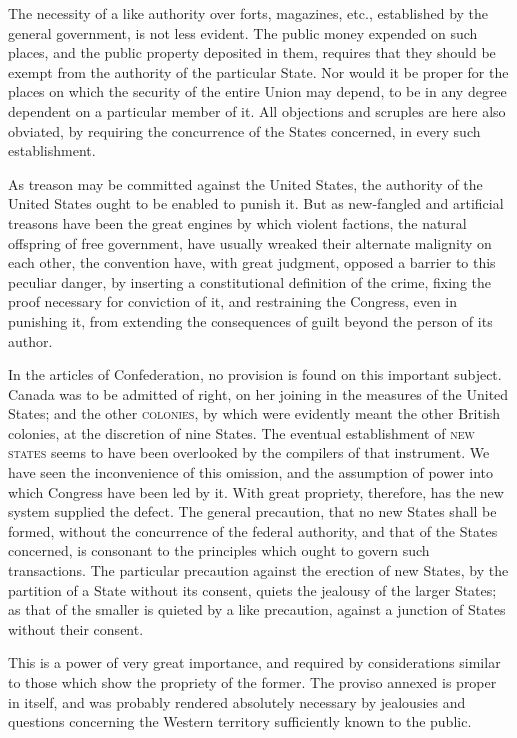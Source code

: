The necessity of a like authority over forts, magazines, etc., established by the general government, is not less evident. The public money expended on such places, and the public property deposited in them, requires that they should be exempt from the authority of the particular State. Nor would it be proper for the places on which the security of the entire Union may depend, to be in any degree dependent on a particular member of it. All objections and scruples are here also obviated, by requiring the concurrence of the States concerned, in every such establishment.

As treason may be committed against the United States, the authority of the United States ought to be enabled to punish it. But as new-fangled and artificial treasons have been the great engines by which violent factions, the natural offspring of free government, have usually wreaked their alternate malignity on each other, the convention have, with great judgment, opposed a barrier to this peculiar danger, by inserting a constitutional definition of the crime, fixing the proof necessary for conviction of it, and restraining the Congress, even in punishing it, from extending the consequences of guilt beyond the person of its author.

In the articles of Confederation, no provision is found on this important subject. Canada was to be admitted of right, on her joining in the measures of the United States; and the other \textsc{colonies}, by which were evidently meant the other British colonies, at the discretion of nine States. The eventual establishment of \textsc{new states }seems to have been overlooked by the compilers of that instrument. We have seen the inconvenience of this omission, and the assumption of power into which Congress have been led by it. With great propriety, therefore, has the new system supplied the defect. The general precaution, that no new States shall be formed, without the concurrence of the federal authority, and that of the States concerned, is consonant to the principles which ought to govern such transactions. The particular precaution against the erection of new States, by the partition of a State without its consent, quiets the jealousy of the larger States; as that of the smaller is quieted by a like precaution, against a junction of States without their consent.

This is a power of very great importance, and required by considerations similar to those which show the propriety of the former. The proviso annexed is proper in itself, and was probably rendered absolutely necessary by jealousies and questions concerning the Western territory sufficiently known to the public.

